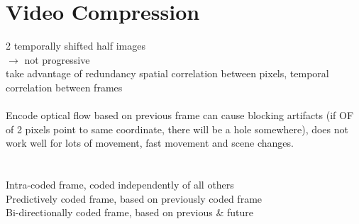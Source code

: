 \section{Video Compression}
 2 temporally shifted half images \\
 $\rightarrow$ not progressive\\
 take advantage of redundancy spatial correlation between pixels, temporal correlation between frames \\
\\
 Encode optical flow based on previous frame can cause blocking artifacts (if OF of 2 pixels point to same coordinate, there will be a hole somewhere), does not work well for lots of movement, fast movement and scene changes.\\
\\
\\
 Intra-coded frame, coded independently of all others\\
 Predictively coded frame, based on previously coded frame\\
 Bi-directionally coded frame, based on previous \& future
